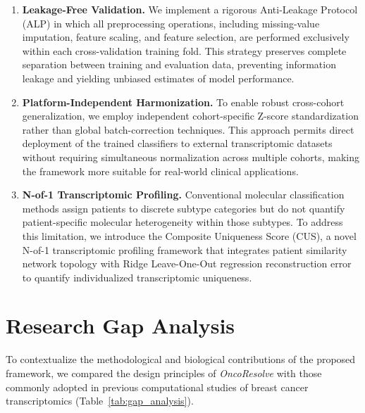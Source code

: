 \documentclass[10pt,a4paper,twocolumn]{article}
\begin{document}
\begin{enumerate}
\item \textbf{Leakage-Free Validation.}
We implement a rigorous Anti-Leakage Protocol (ALP) in which all preprocessing operations, including missing-value imputation, feature scaling, and feature selection, are performed exclusively within each cross-validation training fold. This strategy preserves complete separation between training and evaluation data, preventing information leakage and yielding unbiased estimates of model performance.

\item \textbf{Platform-Independent Harmonization.}
To enable robust cross-cohort generalization, we employ independent cohort-specific Z-score standardization rather than global batch-correction techniques. This approach permits direct deployment of the trained classifiers to external transcriptomic datasets without requiring simultaneous normalization across multiple cohorts, making the framework more suitable for real-world clinical applications.

\item \textbf{N-of-1 Transcriptomic Profiling.}
Conventional molecular classification methods assign patients to discrete subtype categories but do not quantify patient-specific molecular heterogeneity within those subtypes. To address this limitation, we introduce the Composite Uniqueness Score (CUS), a novel N-of-1 transcriptomic profiling framework that integrates patient similarity network topology with Ridge Leave-One-Out regression reconstruction error to quantify individualized transcriptomic uniqueness.
\end{enumerate}

\section{Research Gap Analysis}

To contextualize the methodological and biological contributions of the proposed framework, we compared the design principles of \textit{OncoResolve} with those commonly adopted in previous computational studies of breast cancer transcriptomics (Table~\ref{tab:gap_analysis}).
\end{document}
